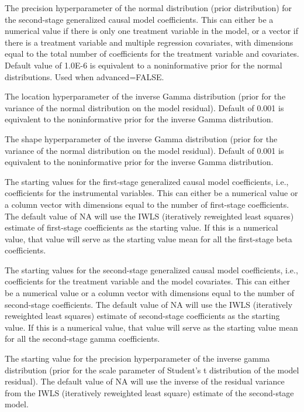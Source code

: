 \documentclass[a4paper]{book}
\begin{document}
\begin{Arguments}
\begin{ldescription}
\item[\code{G0}] The precision hyperparameter of the normal distribution (prior distribution)
for the second-stage generalized causal model coefficients.
This can either be a numerical value if there is only one treatment variable in the model,
or a vector if there is a treatment variable and multiple regression covariates,
with dimensions equal to the total number of coefficients for the treatment variable and covariates.
Default value of 1.0E-6 is equivalent to a noninformative prior for the normal distributions.
Used when advanced=FALSE.

\item[\code{e0}] The location hyperparameter of the inverse Gamma distribution (prior for the variance of the
normal distribution on the model residual).
Default of 0.001 is equivalent to the noninformative prior for the inverse Gamma distribution.

\item[\code{E0}] The shape hyperparameter of the inverse Gamma distribution (prior for the variance of the
normal distribution on the model residual).
Default of 0.001 is equivalent to the noninformative prior for the inverse Gamma distribution.

\item[\code{beta.start}] The starting values for the first-stage generalized causal model coefficients,
i.e., coefficients for the instrumental variables.
This can either be a numerical value or a column vector with dimensions
equal to the number of first-stage coefficients.
The default value of NA will use the IWLS (iteratively reweighted least squares) estimate
of first-stage coefficients as the starting value.
If this is a numerical value, that value will
serve as the starting value mean for all the first-stage beta coefficients.

\item[\code{gamma.start}] The starting values for the second-stage generalized causal model coefficients,
i.e., coefficients for the treatment variable and the model covariates.
This can either be a numerical value or a column vector with dimensions
equal to the number of second-stage coefficients.
The default value of NA will use the IWLS (iteratively reweighted least squares) estimate
of second-stage coefficients as the starting value.
If this is a numerical value, that value will
serve as the starting value mean for all the second-stage gamma coefficients.

\item[\code{e.start}] The starting value for the precision hyperparameter of the inverse gamma distribution
(prior for the scale parameter of Student's t distribution of the model residual).
The default value of NA will use the inverse of the residual variance from the
IWLS (iteratively reweighted least square) estimate of the second-stage model.


\end{ldescription}
\end{Arguments}
\end{document}
